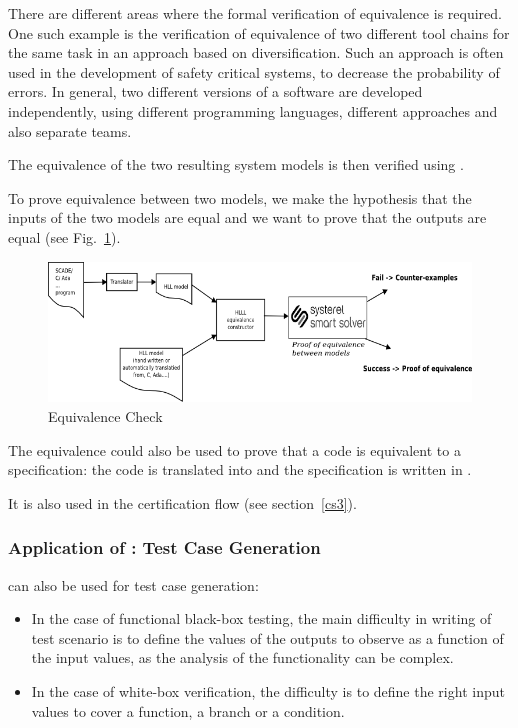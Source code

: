 There are different areas where the formal verification of equivalence is
required. One such example is the verification of equivalence of two different
tool chains for the same task in an approach based on diversification. Such an
approach is often used in the development of safety critical systems, to
decrease the probability of errors. In general,  two different
versions of a software are developed independently, using different programming languages, different
approaches and also separate teams.

The equivalence of the two resulting system models is then verified using
\smartsolver{}. 

To prove equivalence between two \HLL{} models, we make the hypothesis
that the inputs of the two \HLL{} models are equal and we want to prove
that the outputs are equal (see Fig.~\ref{fig:s3-equiv-check}).


\begin{figure}[h]
  \centering
  \includegraphics[width=1\textwidth]{figures/s3equiv}
  \caption{Equivalence Check}
  \label{fig:s3-equiv-check}
\end{figure}


The equivalence could also be used to prove that a code is equivalent to
a specification: the code is translated into \HLL{} and the
specification is written in \HLL{}.

It is also used in the certification flow (see section~\ref{cs3}).


\subsubsection{Application of \smartsolver{}: Test Case Generation}
\label{sec:test-case}

\smartsolver{} can also be used for test case generation:
\begin{itemize}
\item In the case of functional black-box testing, the main difficulty in writing of test scenario is to  define the values of the outputs to observe as a function of the input values, as the analysis of the functionality can be complex.
\item In the case of white-box verification, the difficulty is to define the right input values to cover a function, a branch or a condition.
\end{itemize} 



